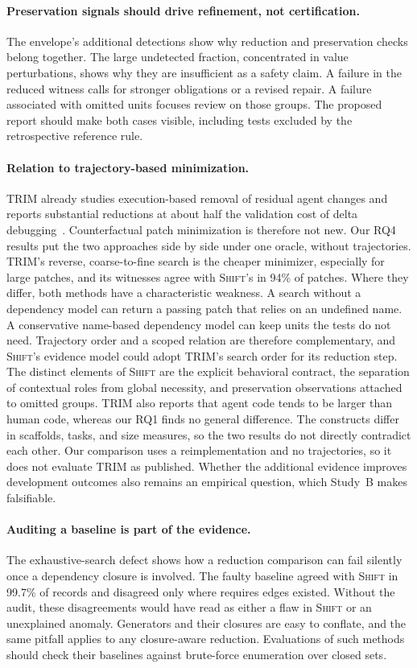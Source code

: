 \documentclass[a4paper,fleqn]{cas-sc}
\newcommand{\tool}{\textsc{Shift}}
\begin{document}
\paragraph{Preservation signals should drive refinement, not certification.}
The envelope's additional detections show why reduction and preservation checks belong together. The large undetected fraction, concentrated in value perturbations, shows why they are insufficient as a safety claim. A failure in the reduced witness calls for stronger obligations or a revised repair. A failure associated with omitted units focuses review on those groups. The proposed report should make both cases visible, including tests excluded by the retrospective reference rule.

\paragraph{Relation to trajectory-based minimization.}
TRIM already studies execution-based removal of residual agent changes and reports substantial reductions at about half the validation cost of delta debugging~\citep{mathai2026trim}. Counterfactual patch minimization is therefore not new. Our RQ4 results put the two approaches side by side under one oracle, without trajectories. TRIM's reverse, coarse-to-fine search is the cheaper minimizer, especially for large patches, and its witnesses agree with \tool{}'s in 94\% of patches. Where they differ, both methods have a characteristic weakness. A search without a dependency model can return a passing patch that relies on an undefined name. A conservative name-based dependency model can keep units the tests do not need. Trajectory order and a scoped relation are therefore complementary, and \tool{}'s evidence model could adopt TRIM's search order for its reduction step. The distinct elements of \tool{} are the explicit behavioral contract, the separation of contextual roles from global necessity, and preservation observations attached to omitted groups. TRIM also reports that agent code tends to be larger than human code, whereas our RQ1 finds no general difference. The constructs differ in scaffolds, tasks, and size measures, so the two results do not directly contradict each other. Our comparison uses a reimplementation and no trajectories, so it does not evaluate TRIM as published. Whether the additional evidence improves development outcomes also remains an empirical question, which Study~B makes falsifiable.

\paragraph{Auditing a baseline is part of the evidence.}
The exhaustive-search defect shows how a reduction comparison can fail silently once a dependency closure is involved. The faulty baseline agreed with \tool{} in 99.7\% of records and disagreed only where requires edges existed. Without the audit, these disagreements would have read as either a flaw in \tool{} or an unexplained anomaly. Generators and their closures are easy to conflate, and the same pitfall applies to any closure-aware reduction. Evaluations of such methods should check their baselines against brute-force enumeration over closed sets.
\end{document}

